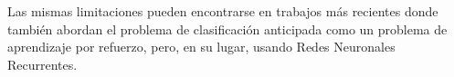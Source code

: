 Las mismas limitaciones pueden encontrarse en trabajos más recientes \cite{yu2017learning, yu2018fast, shen2017reasonet} donde también abordan el problema de clasificación anticipada como un problema de aprendizaje por refuerzo, pero, en su lugar, usando Redes Neuronales Recurrentes.

